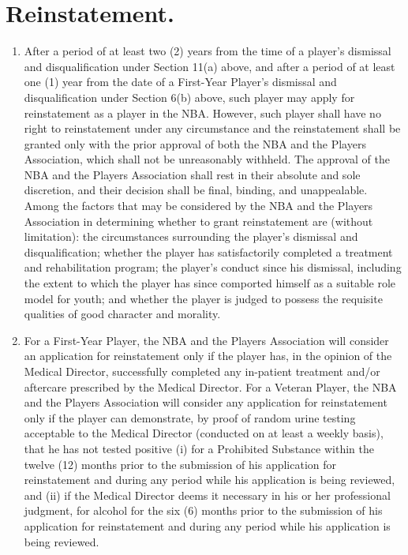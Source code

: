 \documentclass[
]{book}
\begin{document}
\hypertarget{reinstatement.}{%
\section{Reinstatement.}\label{reinstatement.}}

\begin{enumerate}
\def\labelenumi{(\alph{enumi})}
\item
  After a period of at least two (2) years from the time of a player's dismissal and disqualification under Section 11(a) above, and after a period of at least one (1) year from the date of a First-Year Player's dismissal and disqualification under Section 6(b) above, such player may apply for reinstatement as a player in the NBA. However, such player shall have no right to reinstatement under any circumstance and the reinstatement shall be granted only with the prior approval of both the NBA and the Players Association, which shall not be unreasonably withheld. The approval of the NBA and the Players Association shall rest in their absolute and sole discretion, and their decision shall be final, binding, and unappealable. Among the factors that may be considered by the NBA and the Players Association in determining whether to grant reinstatement are (without limitation): the circumstances surrounding the player's dismissal and disqualification; whether the player has satisfactorily completed a treatment and rehabilitation program; the player's conduct since his dismissal, including the extent to which the player has since comported himself as a suitable role model for youth; and whether the player is judged to possess the requisite qualities of good character and morality.
\item
  For a First-Year Player, the NBA and the Players Association will consider an application for reinstatement only if the player has, in the opinion of the Medical Director, successfully completed any in-patient treatment and/or aftercare prescribed by the Medical Director. For a Veteran Player, the NBA and the Players Association will consider any application for reinstatement only if the player can demonstrate, by proof of random urine testing acceptable to the Medical Director (conducted on at least a weekly basis), that he has not tested positive (i) for a Prohibited Substance within the twelve (12) months prior to the submission of his application for reinstatement and during any period while his application is being reviewed, and (ii) if the Medical Director deems it necessary in his or her professional judgment, for alcohol for the six (6) months prior to the submission of his application for reinstatement and during any period while his application is being reviewed.

\end{enumerate}
\end{document}
